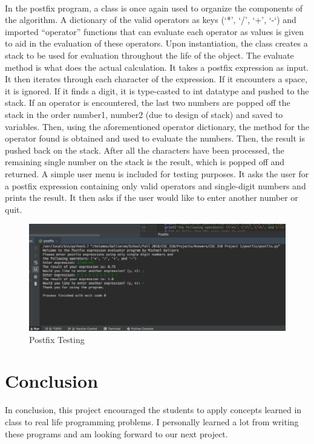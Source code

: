 \documentclass[10pt,letterpaper]{article}
\begin{document}
\paragraph{}
In the postfix program, a class is once again used to organize the components
of the algorithm. A dictionary of the valid operators as keys
(‘*’, ‘/’, ‘+’, ‘-‘) and imported “operator” functions that can evaluate each
operator as values is given to aid in the evaluation of these operators. Upon
instantiation, the class creates a stack to be used for evaluation throughout
the life of the object. The evaluate method is what does the actual
calculation. It takes a postfix expression as input. It then iterates through
each character of the expression. If it encounters a space, it is ignored. If
it finds a digit, it is type-casted to int datatype and pushed to the stack.
If an operator is encountered, the last two numbers are popped off the stack in
the order number1, number2 (due to design of stack) and saved to variables.
Then, using the aforementioned operator dictionary, the method for the operator
found is obtained and used to evaluate the numbers. Then, the result is pushed
back on the stack. After all the characters have been processed, the remaining
single number on the stack is the result, which is popped off and returned. A
simple user menu is included for testing purposes. It asks the user for a
postfix expression containing only valid operators and single-digit numbers and
prints the result. It then asks if the user would like to enter another number
or quit.

\begin{figure}[H]
\centering
\includegraphics[width=\linewidth]{postfix_testing.png}
\caption{Postfix Testing}
\end{figure}

\section{Conclusion}
In conclusion, this project encouraged the students to apply concepts learned
in class to real life programming problems. I personally learned a lot from
writing these programs and am looking forward to our next project.
\end{document}
